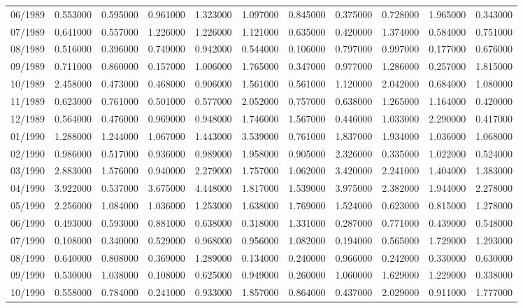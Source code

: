 \begin{tabular}{lrrrrrrrrrr}
06/1989 & 0.553000 & 0.595000 & 0.961000 & 1.323000 & 1.097000 & 0.845000 & 0.375000 & 0.728000 & 1.965000 & 0.343000 \\
07/1989 & 0.641000 & 0.557000 & 1.226000 & 1.226000 & 1.121000 & 0.635000 & 0.420000 & 1.374000 & 0.584000 & 0.751000 \\
08/1989 & 0.516000 & 0.396000 & 0.749000 & 0.942000 & 0.544000 & 0.106000 & 0.797000 & 0.997000 & 0.177000 & 0.676000 \\
09/1989 & 0.711000 & 0.860000 & 0.157000 & 1.006000 & 1.765000 & 0.347000 & 0.977000 & 1.286000 & 0.257000 & 1.815000 \\
10/1989 & 2.458000 & 0.473000 & 0.468000 & 0.906000 & 1.561000 & 0.561000 & 1.120000 & 2.042000 & 0.684000 & 1.080000 \\
11/1989 & 0.623000 & 0.761000 & 0.501000 & 0.577000 & 2.052000 & 0.757000 & 0.638000 & 1.265000 & 1.164000 & 0.420000 \\
12/1989 & 0.564000 & 0.476000 & 0.969000 & 0.948000 & 1.746000 & 1.567000 & 0.446000 & 1.033000 & 2.290000 & 0.417000 \\
01/1990 & 1.288000 & 1.244000 & 1.067000 & 1.443000 & 3.539000 & 0.761000 & 1.837000 & 1.934000 & 1.036000 & 1.068000 \\
02/1990 & 0.986000 & 0.517000 & 0.936000 & 0.989000 & 1.958000 & 0.905000 & 2.326000 & 0.335000 & 1.022000 & 0.524000 \\
03/1990 & 2.883000 & 1.576000 & 0.940000 & 2.279000 & 1.757000 & 1.062000 & 3.420000 & 2.241000 & 1.404000 & 1.383000 \\
04/1990 & 3.922000 & 0.537000 & 3.675000 & 4.448000 & 1.817000 & 1.539000 & 3.975000 & 2.382000 & 1.944000 & 2.278000 \\
05/1990 & 2.256000 & 1.084000 & 1.036000 & 1.253000 & 1.638000 & 1.769000 & 1.524000 & 0.623000 & 0.815000 & 1.278000 \\
06/1990 & 0.493000 & 0.593000 & 0.881000 & 0.638000 & 0.318000 & 1.331000 & 0.287000 & 0.771000 & 0.439000 & 0.548000 \\
07/1990 & 0.108000 & 0.340000 & 0.529000 & 0.968000 & 0.956000 & 1.082000 & 0.194000 & 0.565000 & 1.729000 & 1.293000 \\
08/1990 & 0.640000 & 0.808000 & 0.369000 & 1.289000 & 0.134000 & 0.240000 & 0.966000 & 0.242000 & 0.330000 & 0.630000 \\
09/1990 & 0.530000 & 1.038000 & 0.108000 & 0.625000 & 0.949000 & 0.260000 & 1.060000 & 1.629000 & 1.229000 & 0.338000 \\
10/1990 & 0.558000 & 0.784000 & 0.241000 & 0.933000 & 1.857000 & 0.864000 & 0.437000 & 2.029000 & 0.911000 & 1.777000 \\

\end{tabular}
